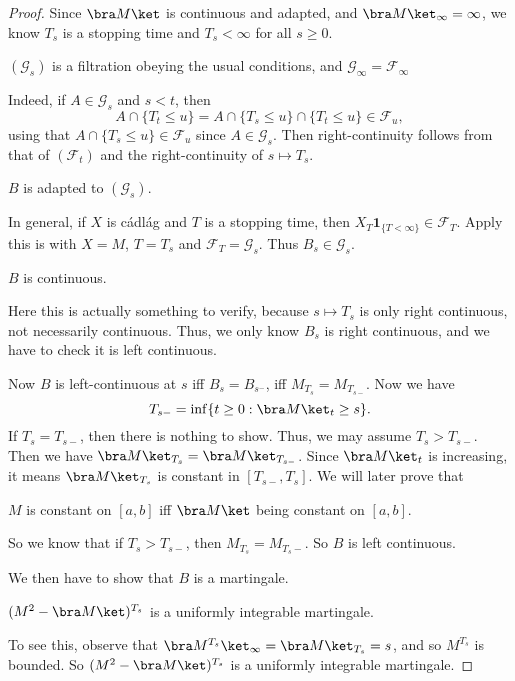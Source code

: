 \documentclass[a4paper]{article}
\begin{document}
\begin{proof}
  Since $\bra M\ket$ is continuous and adapted, and $\bra M\ket_\infty = \infty$, we know $T_s$ is a stopping time and $T_s < \infty$ for all $s \geq 0$.
  \begin{claim}
    $(\mathcal{G}_s)$ is a filtration obeying the usual conditions, and $\mathcal{G}_\infty = \mathcal{F}_\infty$
  \end{claim}
  Indeed, if $A \in \mathcal{G}_s$ and $s < t$, then
  \[
    A \cap \{T_t \leq u\} = A \cap \{T_s \leq u\} \cap \{T_t \leq u\} \in \mathcal{F}_u,
  \]
  using that $A \cap \{T_s \leq u\} \in \mathcal{F}_u$ since $A \in \mathcal{G}_s$. Then right-continuity follows from that of $(\mathcal{F}_t)$ and the right-continuity of $s \mapsto T_s$.

  \begin{claim}
    $B$ is adapted to $(\mathcal{G}_s)$.
  \end{claim}
  In general, if $X$ is c\'adl\'ag and $T$ is a stopping time, then $X_T \mathbf{1}_{\{T < \infty\}} \in \mathcal{F}_T$. Apply this is with $X = M$, $T = T_s$ and $\mathcal{F}_T = \mathcal{G}_s$. Thus $B_s \in \mathcal{G}_s$.

  \begin{claim}
    $B$ is continuous.
  \end{claim}
  Here this is actually something to verify, because $s \mapsto T_s$ is only right continuous, not necessarily continuous. Thus, we only know $B_s$ is right continuous, and we have to check it is left continuous.

  Now $B$ is left-continuous at $s$ iff $B_s = B_{s^-}$, iff $M_{T_s} = M_{T_{s-}}$.
  Now we have
  \[
    T_{s-} = \inf \{t \geq 0 : \bra M\ket_t \geq s\}.
  \]
  If $T_s = T_{s-}$, then there is nothing to show. Thus, we may assume $T_s > T_{s-}$. Then we have $\bra M\ket_{T_s} = \bra M\ket_{T_{s-}}$. Since $\bra M\ket_t$ is increasing, it means $\bra M\ket_{T_s}$ is constant in $[T_{s-}, T_s]$. We will later prove that
  \begin{lemma}
    $M$ is constant on $[a, b]$ iff $\bra M\ket$ being constant on $[a, b]$.
  \end{lemma}
  So we know that if $T_s > T_{s-}$, then $M_{T_s} = M_{T_s-}$. So $B$ is left continuous.

  We then have to show that $B$ is a martingale.
  \begin{claim}
    $(M^2 - \bra M\ket)^{T_s}$ is a uniformly integrable martingale.
  \end{claim}
  To see this, observe that $\bra M^{T_s}\ket_\infty = \bra M\ket_{T_s} = s$, and so $M^{T_s}$ is bounded. So $(M^2 - \bra M\ket)^{T_s}$ is a uniformly integrable martingale.


\end{proof}
\end{document}
